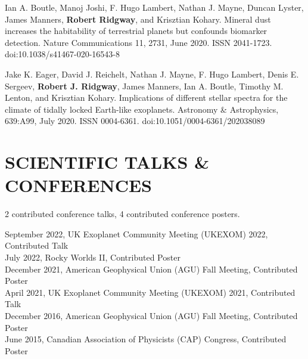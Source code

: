 \documentclass[letter, margin, 10pt]{res} %
\begin{document}
\begin{resume}
Ian A. Boutle, Manoj Joshi, F. Hugo Lambert, Nathan J. Mayne, Duncan Lyster, James Manners, \textbf{Robert Ridgway}, and Krisztian Kohary. Mineral dust increases the habitability of terrestrial planets but confounds biomarker detection. Nature Communications 11, 2731, June 2020. ISSN 2041-1723. doi:10.1038/s41467-020-16543-8

Jake K. Eager, David J. Reichelt, Nathan J. Mayne, F. Hugo Lambert, Denis E. Sergeev, \textbf{Robert J. Ridgway}, James Manners, Ian A. Boutle, Timothy M. Lenton, and Krisztian Kohary. Implications of different stellar spectra for the climate of tidally locked Earth-like exoplanets. Astronomy \& Astrophysics, 639:A99, July 2020. ISSN 0004-6361. doi:10.1051/0004-6361/202038089



\parskip \baselineskip
\vspace{-6pt}
\section{SCIENTIFIC TALKS \& CONFERENCES}
2 contributed conference talks, 4 contributed conference posters.

\vspace{-4pt}
September 2022, UK Exoplanet Community Meeting (UKEXOM) 2022, Contributed Talk \\
July 2022, Rocky Worlds II, Contributed Poster \\
December 2021, American Geophysical Union (AGU) Fall Meeting, Contributed Poster\\
April 2021, UK Exoplanet Community Meeting (UKEXOM) 2021, Contributed Talk\\
December 2016, American Geophysical Union (AGU) Fall Meeting, Contributed Poster\\
June 2015, Canadian Association of Physicists (CAP) Congress, Contributed Poster


\end{resume}
\end{document}
